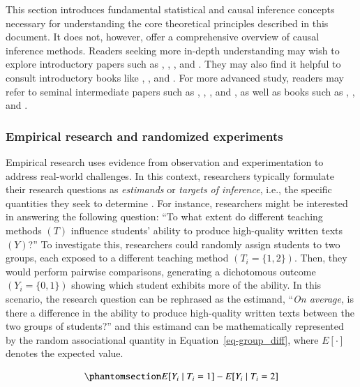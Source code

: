 \documentclass[
  authoryear,
  review,
  1p]{elsarticle}
\begin{document}
This section introduces fundamental statistical and causal inference
concepts necessary for understanding the core theoretical principles
described in this document. It does not, however, offer a comprehensive
overview of causal inference methods. Readers seeking more in-depth
understanding may wish to explore introductory papers such as
\citet{Pearl_2010}, \citet{Rohrer_2018}, \citet{Pearl_2019}, and
\citet{Cinelli_et_al_2020}. They may also find it helpful to consult
introductory books like \citet{Pearl_et_al_2018}, \citet{Neal_2020}, and
\citet{McElreath_2020}. For more advanced study, readers may refer to
seminal intermediate papers such as \citet{Neyman_et_al_1923},
\citet{Rubin_1974}, \citet{Spirtes_et_al_1991}, and \citet{Sekhon_2009},
as well as books such as \citet{Pearl_2009}, \citet{Morgan_et_al_2014},
and \citet{Hernan_et_al_2025}.

\subsubsection{Empirical research and randomized
experiments}\label{sec-appendixB1}

Empirical research uses evidence from observation and experimentation to
address real-world challenges. In this context, researchers typically
formulate their research questions as \emph{estimands} or \emph{targets
of inference}, i.e., the specific quantities they seek to determine
\citep{Everitt_et_al_2010}. For instance, researchers might be
interested in answering the following question: ``To what extent do
different teaching methods \((T)\) influence students' ability to
produce high-quality written texts \((Y)\)?'' To investigate this,
researchers could randomly assign students to two groups, each exposed
to a different teaching method \((T_{i} = \{1,2\})\). Then, they would
perform pairwise comparisons, generating a dichotomous outcome
\((Y_{i} = \{0,1\})\) showing which student exhibits more of the
ability. In this scenario, the research question can be rephrased as the
estimand, ``\emph{On average}, is there a difference in the ability to
produce high-quality written texts between the two groups of students?''
and this estimand can be mathematically represented by the random
associational quantity in Equation~\ref{eq-group_diff}, where
\(E[\cdot]\) denotes the expected value.

\begin{equation}\phantomsection\label{eq-group_diff}{
E[Y_{i} \mid T_{i}=1] - E[Y_{i} \mid T_{i}=2]
}\end{equation}
\end{document}
